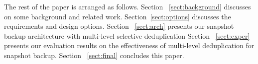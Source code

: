 The rest of the paper is arranged as follows. 
Section ~\ref{sect:background}
discusses on some background and related work.
Section~\ref{sect:options} discusses the requirements and  design options.
Section ~\ref{sect:arch} presents our snapshot backup architecture with multi-level selective deduplication 
Section ~\ref{sect:exper} presents  our evaluation results on the effectiveness
of multi-level deduplication for snapshot backup. 
Section ~\ref{sect:final} concludes this paper.
